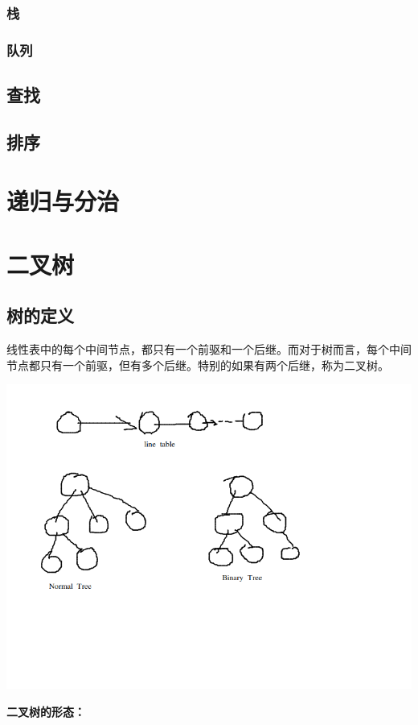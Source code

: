 \documentclass{article}
\begin{document}
\subsubsection{栈}
\subsubsection{队列}
\subsection{查找}
\subsection{排序}
\section{递归与分治}
\section{二叉树}
	\subsection{树的定义}
		线性表中的每个中间节点，都只有一个前驱和一个后继。而对于树而言，每个中间节点都只有一个前驱，但有多个后继。特别的如果有两个后继，称为二叉树。

	\includegraphics[scale=0.4]{./pic/tree-01.png}

	\textbf{二叉树的形态：}
\end{document}
